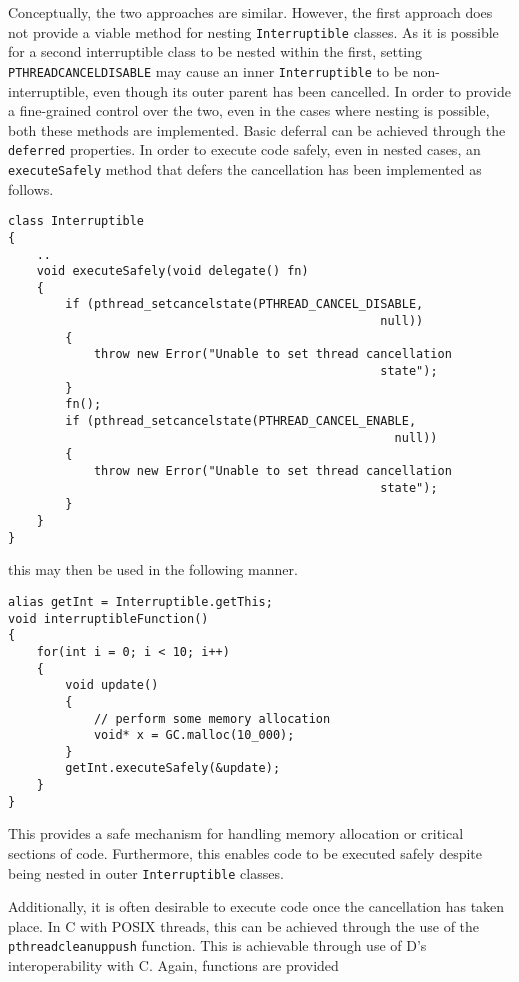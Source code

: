 Conceptually, the two approaches are similar. However, the first approach does 
not provide a viable method for nesting \texttt{Interruptible} classes. As it is 
possible for a second interruptible class to be nested within the first, setting 
\texttt{PTHREAD\textunderscore{}CANCEL\textunderscore{}DISABLE} may cause an 
inner \texttt{Interruptible} to be non-interruptible, even though its outer parent 
has been cancelled. In order to provide a fine-grained control over the two, 
even in the cases where nesting is possible, both these methods are implemented. 
Basic deferral can be achieved through the \texttt{deferred} properties. In order 
to execute code safely, even in nested cases, an \texttt{executeSafely} method that 
defers the cancellation has been implemented as follows. 
\begin{lstlisting}
class Interruptible
{
    ..
    void executeSafely(void delegate() fn)
    {
        if (pthread_setcancelstate(PTHREAD_CANCEL_DISABLE, 
                                                    null))
        {
            throw new Error("Unable to set thread cancellation 
                                                    state");
        }
        fn();
        if (pthread_setcancelstate(PTHREAD_CANCEL_ENABLE, 
                                                      null))
        {
            throw new Error("Unable to set thread cancellation 
                                                    state");
        }
    }
}
\end{lstlisting}
this may then be used in the following manner. 
\begin{lstlisting}
alias getInt = Interruptible.getThis;
void interruptibleFunction() 
{
    for(int i = 0; i < 10; i++)
    {
        void update() 
        {
            // perform some memory allocation
            void* x = GC.malloc(10_000); 
        }
        getInt.executeSafely(&update);
    }
}
\end{lstlisting}
This provides a safe mechanism for handling memory allocation or critical sections 
of code. Furthermore, this enables code to be executed safely despite being 
nested in outer \texttt{Interruptible} classes. 
\par\bigskip\noindent
Additionally, it is often desirable to execute code once the cancellation has taken 
place. In C with POSIX threads, this can be achieved through the use of the 
\texttt{pthread\textunderscore{}cleanup\textunderscore{}push} function. 
This is achievable through use of D's interoperability with C. Again, functions are provided 
